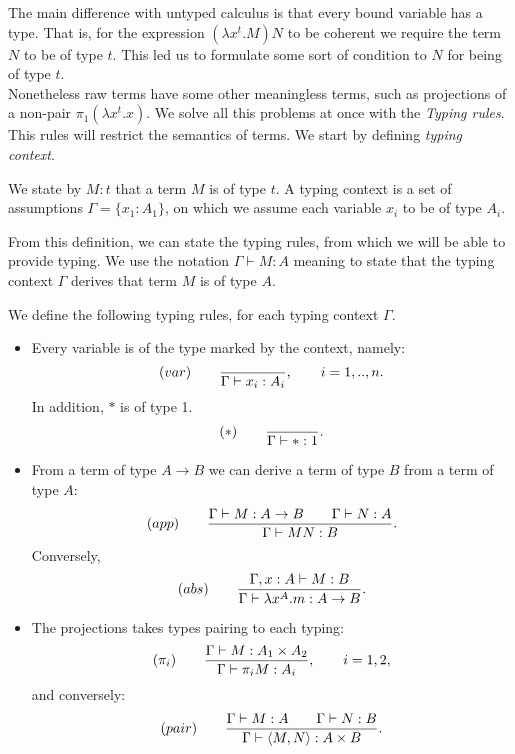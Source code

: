 The main difference with untyped calculus is that every bound variable has a type. That is, for the expression $(\lambda x^t.M)N$ to be coherent we require the term $N$ to be of type $t$. This led us to formulate some sort of condition to $N$ for being of type $t$.\\

Nonetheless raw terms have some other meaningless terms, such as projections of a non-pair $\pi_1(\lambda x^t.x)$. We solve all this problems at once with the \emph {Typing rules}. This rules will restrict the semantics of terms. We start by defining \emph{typing context}.

\begin{definition}
  We state by $M:t$  that a term $M$ is of type $t$. A typing context is a set of assumptions $\Gamma = \{x_1:A_1\}$, on which we assume each variable $x_i$ to be of type $A_i$.
\end{definition}

\begin{remark}
  From this definition, we can state the typing rules, from which we will be able to provide typing. We use the notation $\Gamma \vdash M:A$ meaning to state that the typing context $\Gamma$ derives that term $M$ is of type $A$. 
\end{remark}


\begin{definition}\label{def:typing-rules}
  We define the following typing rules, for each typing context $\Gamma$.
  \begin{itemize}
  \item Every variable is of the type marked by the context, namely:
    $$  (var)\qquad  {\displaystyle \over \Gamma \vdash x_i:A_i},\qquad  i=  1,..,n.$$
    In addition,  $*$ is of type 1.
    $$  (*)\qquad  {\displaystyle \over \Gamma\vdash *:1}.$$

  \item From a term of type $A\to B$ we can derive a term of type $B$ from a term of type $A$:
    $$(app)\qquad  {\displaystyle \Gamma \vdash M:A\to B\qquad \Gamma \vdash N:A      \over \Gamma \vdash MN:B}.$$
    Conversely, 
    $$(abs)\qquad  {\displaystyle \Gamma, x: A\vdash M: B  \over \Gamma \vdash \lambda x^A.m:A\to B}.$$
  \item The projections takes types pairing to each typing:
    $$(\pi_i) \qquad {\displaystyle \Gamma\vdash M: A_1\times A_2 \over \Gamma \vdash \pi_i M: A_i},\qquad i=1,2,$$
    and conversely:
    $$(pair) \qquad {\displaystyle \Gamma\vdash M: A\qquad \Gamma\vdash N: B \over \Gamma \vdash \langle M, N\rangle:  A\times B}.$$
  \end{itemize}
\end{definition}




